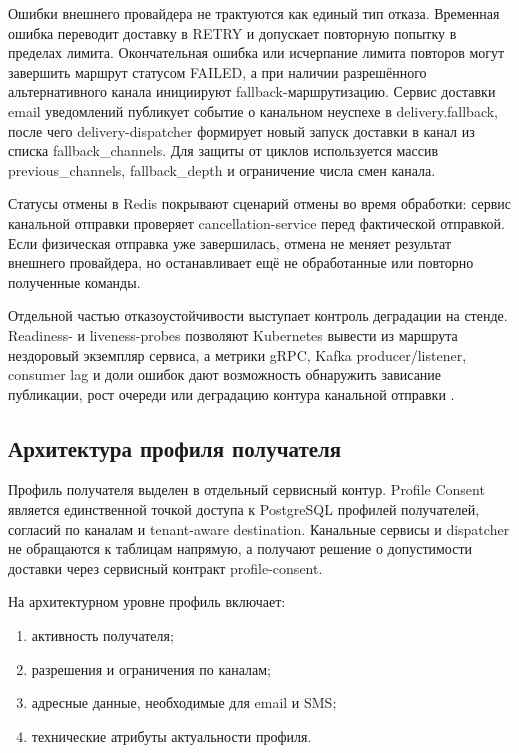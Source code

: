 Ошибки внешнего провайдера не трактуются как единый тип отказа. Временная ошибка переводит доставку в RETRY и допускает повторную попытку в пределах лимита. Окончательная ошибка или исчерпание лимита повторов могут завершить маршрут статусом FAILED, а при наличии разрешённого альтернативного канала инициируют fallback-маршрутизацию. Сервис доставки email уведомлений публикует событие о канальном неуспехе в delivery.fallback, после чего delivery-dispatcher формирует новый запуск доставки в канал из списка fallback\_channels. Для защиты от циклов используется массив previous\_channels, fallback\_depth и ограничение числа смен канала.

Статусы отмены в Redis покрывают сценарий отмены во время обработки: сервис канальной отправки проверяет cancellation-service перед фактической отправкой. Если физическая отправка уже завершилась, отмена не меняет результат внешнего провайдера, но останавливает ещё не обработанные или повторно полученные команды.

Отдельной частью отказоустойчивости выступает контроль деградации на стенде. Readiness- и liveness-probes позволяют Kubernetes вывести из маршрута нездоровый экземпляр сервиса, а метрики gRPC, Kafka producer/listener, consumer lag и доли ошибок дают возможность обнаружить зависание публикации, рост очереди или деградацию контура канальной отправки \cite{kubernetes_in_action}.

\subsection{Архитектура профиля получателя}

Профиль получателя выделен в отдельный сервисный контур. Profile Consent является единственной точкой доступа к PostgreSQL профилей получателей, согласий по каналам и tenant-aware destination. Канальные сервисы и dispatcher не обращаются к таблицам напрямую, а получают решение о допустимости доставки через сервисный контракт profile-consent.

На архитектурном уровне профиль включает:
\begin{enumerate}
    \item активность получателя;
    \item разрешения и ограничения по каналам;
    \item адресные данные, необходимые для email и SMS;
    \item технические атрибуты актуальности профиля.
\end{enumerate}

